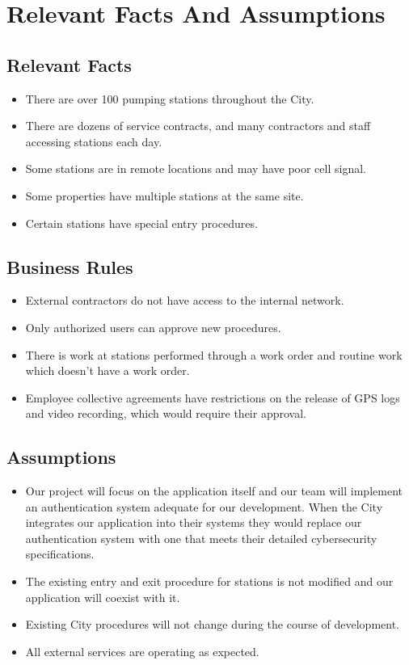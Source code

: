 \documentclass[12pt]{article}
\begin{document}
\section{Relevant Facts And Assumptions}
\subsection{Relevant Facts}
\begin{itemize}
  \item There are over 100 pumping stations throughout the City.
  \item There are dozens of service contracts, and many contractors
    and staff accessing stations each day.
  \item Some stations are in remote locations and may have poor cell signal.
  \item Some properties have multiple stations at the same site.
  \item Certain stations have special entry procedures.
\end{itemize}

\subsection{Business Rules}
\begin{itemize}
  \item External contractors do not have access to the internal network.
  \item Only authorized users can approve new procedures.
  \item There is work at stations performed through a work order
    and routine work which doesn't have a work order.
  \item Employee collective agreements have restrictions on the release of
    GPS logs and video recording, which would require their approval.
\end{itemize}
\subsection{Assumptions}
\begin{itemize}
  \item Our project will focus on the application itself
    and our team will implement an authentication system adequate for our
    development. When the City integrates our application into their systems
    they would replace our authentication system with one that meets their
    detailed cybersecurity specifications.
  \item The existing entry and exit procedure for stations is not modified
    and our application will coexist with it.
  \item Existing City procedures will not change during the course of development.
  \item All external services are operating as expected.
\end{itemize}
\end{document}
